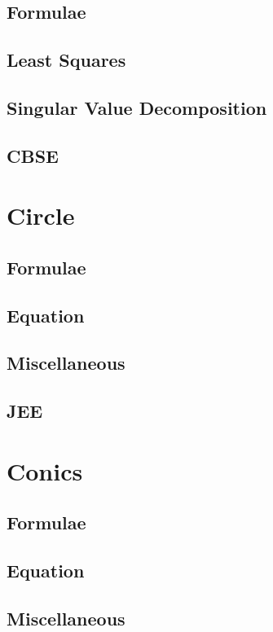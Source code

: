 \documentclass[journal]{IEEEtran}
\begin{document}
\subsection{Formulae}

\subsection{Least Squares}

\subsection{Singular Value Decomposition}

\subsection{CBSE}

\newpage
\section{Circle}
\subsection{Formulae}

\subsection{Equation}

\subsection{Miscellaneous}

\subsection{JEE}

\newpage
\section{Conics}
\subsection{Formulae}

\subsection{Equation}

\subsection{Miscellaneous}

\end{document}
